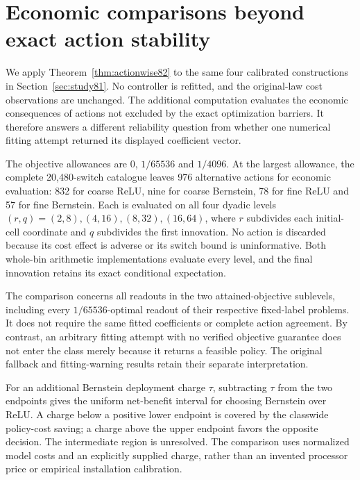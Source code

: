 \section{Economic comparisons beyond exact action stability}\label{sec:study82}
We apply Theorem~\ref{thm:actionwise82} to the same four calibrated constructions in Section~\ref{sec:study81}. No controller is refitted, and the original-law cost observations are unchanged. The additional computation evaluates the economic consequences of actions not excluded by the exact optimization barriers. It therefore answers a different reliability question from whether one numerical fitting attempt returned its displayed coefficient vector.

The objective allowances are $0$, $1/65536$ and $1/4096$. At the largest allowance, the complete 20,480-switch catalogue leaves 976 alternative actions for economic evaluation: 832 for coarse ReLU, nine for coarse Bernstein, 78 for fine ReLU and 57 for fine Bernstein. Each is evaluated on all four dyadic levels $(r,q)=(2,8),(4,16),(8,32),(16,64)$, where $r$ subdivides each initial-cell coordinate and $q$ subdivides the first innovation. No action is discarded because its cost effect is adverse or its switch bound is uninformative. Both whole-bin arithmetic implementations evaluate every level, and the final innovation retains its exact conditional expectation.




The comparison concerns all readouts in the two attained-objective sublevels, including every $1/65536$-optimal readout of their respective fixed-label problems. It does not require the same fitted coefficients or complete action agreement. By contrast, an arbitrary fitting attempt with no verified objective guarantee does not enter the class merely because it returns a feasible policy. The original fallback and fitting-warning results retain their separate interpretation.

For an additional Bernstein deployment charge $\tau$, subtracting $\tau$ from the two endpoints gives the uniform net-benefit interval for choosing Bernstein over ReLU. A charge below a positive lower endpoint is covered by the classwide policy-cost saving; a charge above the upper endpoint favors the opposite decision. The intermediate region is unresolved. The comparison uses normalized model costs and an explicitly supplied charge, rather than an invented processor price or empirical installation calibration.

